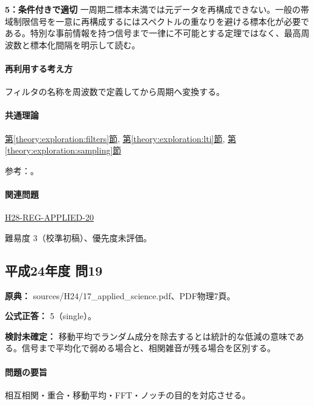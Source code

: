 \noindent\textbf{5：条件付きで適切} 一周期二標本未満では元データを再構成できない。一般の帯域制限信号を一意に再構成するにはスペクトルの重なりを避ける標本化が必要である。特別な事前情報を持つ信号まで一律に不可能とする定理ではなく、最高周波数と標本化間隔を明示して読む。\par

\paragraph{再利用する考え方} フィルタの名称を周波数で定義してから周期へ変換する。

\paragraph{共通理論} \hyperref[theory:exploration:filters]{第\ref*{theory:exploration:filters}節}, \hyperref[theory:exploration:lti]{第\ref*{theory:exploration:lti}節}, \hyperref[theory:exploration:sampling]{第\ref*{theory:exploration:sampling}節}

\par 参考：\cite{mit_signals2010,mit_moving2012,scipy_notch,scipy_fft,usgs_processing2000}。

\paragraph{関連問題} \hyperref[q:h28-reg-applied-20]{H28-REG-APPLIED-20}

\par 難易度 3（校準初稿）、優先度未評価。

\subsection{平成24年度 問19}
\label{q:h24-reg-applied-19}

\noindent\textbf{原典：} sources/H24/17\_applied\_science.pdf、PDF物理7頁。

\textbf{公式正答：} 5（single）。

\par\textbf{検討未確定：} 移動平均でランダム成分を除去するとは統計的な低減の意味である。信号まで平均化で弱める場合と、相関雑音が残る場合を区別する。

\paragraph{問題の要旨} 相互相関・重合・移動平均・FFT・ノッチの目的を対応させる。

